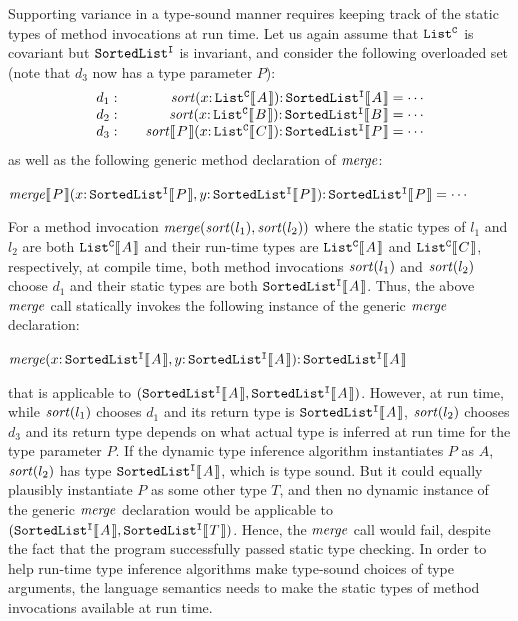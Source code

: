 Supporting variance in a type-sound manner requires keeping
track of the static types of method invocations at run time.
Let us again assume that $\mathtt{List^C}$ is covariant but $\mathtt{SortedList^I}$ is invariant,
and consider the following overloaded set (note that $d_3$ now has a type parameter $P$):
\[\begin{array}[ht]{r@{\qquad}r}
d_1:&\mbox{\textit{sort}}(x \COLON \kwd{List^C}\ob{A}) \COLON \kwd{SortedList^I}\ob{A} = \cdots\\
d_2:&\mbox{\textit{sort}}(x \COLON \kwd{List^C}\ob{B}) \COLON \kwd{SortedList^I}\ob{B} = \cdots\\
d_3:&\mbox{\textit{sort}}\ob{P}(x \COLON \kwd{List^C}\ob{C}) \COLON \kwd{SortedList^I}\ob{P} = \cdots\\
\end{array}\]
as well as the following generic method declaration of $\mbox{\textit{merge}}$:
\begin{center}
$\mbox{\textit{merge}}\ob{P}(x \COLON \kwd{SortedList^I}\ob{P}, y \COLON \kwd{SortedList^I}\ob{P}) \COLON \kwd{SortedList^I}\ob{P} = \cdots$
\end{center}
For a method invocation
$\mbox{\textit{merge}}(\mbox{\textit{sort}}(l_1), \mbox{\textit{sort}}(l_2))$
where the static types of $l_1$ and $l_2$ are both $\kwd{List^C}\ob{A}$ and
their run-time types are $\kwd{List^C}\ob{A}$ and $\kwd{List^C}\ob{C}$, respectively,
at compile time, both method invocations $\mbox{\textit{sort}}(l_1)$ and
$\mbox{\textit{sort}}(l_2)$ choose $d_1$ and their static types are both
$\kwd{SortedList^I}\ob{A}$.  Thus, the above $\mbox{\textit{merge}}$ call
statically invokes the following instance of the generic
$\mbox{\textit{merge}}$ declaration:
\begin{center}
$\mbox{\textit{merge}}(x \COLON \kwd{SortedList^I}\ob{A}, y \COLON \kwd{SortedList^I}\ob{A}) \COLON \kwd{SortedList^I}\ob{A}$
\end{center}
that is applicable to $\tuple{\kwd{SortedList^I}\ob{A}, \kwd{SortedList^I}\ob{A}}$.
However, at run time, while $\mbox{\textit{sort}}(l_1)$ chooses $d_1$ and
its return type is $\kwd{SortedList^I}\ob{A}$, $\mbox{\textit{sort}}(l_2)$
chooses $d_3$ and its return type depends on what actual type is inferred at run time for the type parameter $P$.
If the dynamic type inference algorithm instantiates $P$ as $A$,
$\mbox{\textit{sort}}(l_2)$ has type $\kwd{SortedList^I}\ob{A}$, which is
type sound.  But it could equally plausibly instantiate $P$ as some other type $T$,
and then no dynamic instance of the generic $\mbox{\textit{merge}}$
declaration would be applicable to 
$\tuple{\kwd{SortedList^I}\ob{A}, \kwd{SortedList^I}\ob{T}}$.
Hence, the $\mbox{\textit{merge}}$ call would fail, despite the fact that
the program successfully passed static type checking.
In order to help run-time type inference
algorithms make type-sound choices of type arguments, the language
semantics needs to make the static types of method invocations available at run time.

